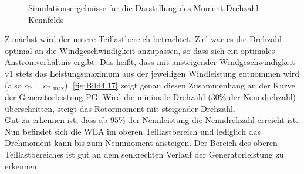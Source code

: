 \begin{figure}[H]
   \centering
   \caption[Simulation des Moment-Drehzahl-Kennfelds]{Simulationsergebnisse für die Darstellung des Moment-Drehzahl-Kennfelds}
   \label{fig:Bild4.17}
\end{figure}
Zunächst wird der untere Teillastbereich betrachtet. Ziel war es die Drehzahl optimal an die Windgeschwindigkeit anzupassen, so dass sich ein optimales Anströmverhältnis ergibt. Das heißt, dass mit ansteigender Windgeschwindigkeit \acs{v1} stets das Leistungsmaximum aus der jeweiligen Windleistung entnommen wird (also $c_{\mathrm{P}} = c_{\mathrm{P,max}}$). \autoref{fig:Bild4.17} zeigt genau diesen Zusammenhang an der Kurve der Generatorleistung \acs{PG}. Wird die minimale Drehzahl ($30\%$ der Nenndrehzahl) überschritten, steigt das Rotormoment mit steigender Drehzahl.\\
Gut zu erkennen ist, dass ab $95\%$ der Nennleistung die Nenndrehzahl erreicht ist. Nun befindet sich die WEA im oberen Teillastbereich und lediglich das Drehmoment kann bis zum Nennmoment ansteigen. Der Bereich des oberen Teillastbereiches ist gut an dem senkrechten Verlauf der Generatorleistung zu erkennen.\\

